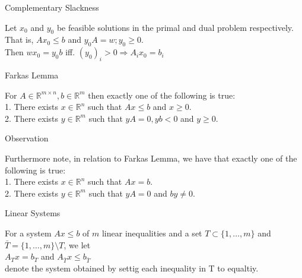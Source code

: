 \documentclass{beamer}
\begin{document}

\begin{frame}  %

	\begin{block}{Complementary Slackness}

		Let $x_0$ and $y_0$ be feasible solutions in the primal and dual problem respectively.
		That is, $Ax_0 \leq b$ and $y_0 A = w; y_0 \geq 0$. \\
		Then $w x_0 = y_0 b$ iff. $(y_0)_i > 0  \Rightarrow A_i x_0 = b_i$

	\end{block}	

	\begin{block}{Farkas Lemma}

		For $A \in \mathbb{R}^{m \times n}, b \in \mathbb{R}^{m}$ then exactly one of the following is true: \\
		1. There exists $x \in \mathbb{R}^n$ such that $Ax \leq b$ and $x\geq 0$. \\
		2. There exists $y \in \mathbb{R}^m$ such that $yA=0, yb<0$ and $y \geq 0$. 

	\end{block}

	\begin{block}{Observation}

		Furthermore note, in relation to Farkas Lemma, we have that exactly one of the following is true: \\
		1. There exists $x \in \mathbb{R}^n$ such that $Ax=b$. \\
		2. There exists $y \in \mathbb{R}^m$ such that $yA=0$ and $by \neq 0$.


	\end{block}

\end{frame}


\begin{frame}

	\begin{block}{Linear Systems}

		For a system $Ax \leq b$ of $m$ linear inequalities and a set $T\subset \{1, \dots, m \}$ and $\bar{T} = \{1, \dots, m \} \setminus T$, we let\\ $A_T x = b_T$ and $A_{\bar{T}} x \leq b_{\bar{T}}$ \\denote the system obtained by settig each inequality in T to equaltiy. 

	\end{block}

\end{frame}
\end{document}

